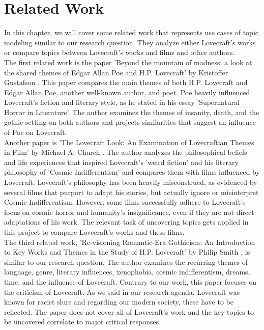 \section{Related Work}

In this chapter, we will cover some related work that represents use cases of topic modeling 
similar to our research question. They analyze either Lovecraft's works or compare topics 
between Lovecraft's works and films and other authors.\\

The first related work is the paper 'Beyond the mountain of madness: a look at the shared 
themes of Edgar Allan Poe and H.P. Lovecraft' by Kristoffer Gustafson \cite{gusta}. This paper compares 
the main themes of both H.P. Lovecraft and Edgar Allan Poe, another well-known author, and 
poet. Poe heavily influenced Lovecraft's fiction and literary style, as he stated in his essay 
'Supernatural Horror in Literature'. The author examines the themes of insanity, death, and the 
gothic setting on both authors and projects similarities that suggest an influence of Poe on 
Lovecraft.\\

Another paper is 'The Lovecraft Look: An Examination of Lovecraftian Themes in Film' by 
Michael A. Church \cite{church}. The author analyzes the philosophical beliefs and life experiences that 
inspired Lovecraft's 'weird fiction' and his literary philosophy of 'Cosmic Indifferentism' 
and compares them with films influenced by Lovecraft. Lovecraft's philosophy has been heavily 
misconstrued, as evidenced by several films that purport to adapt his stories, but actually 
ignore or misinterpret Cosmic Indifferentism. However, some films successfully adhere to 
Lovecraft's focus on cosmic horror and humanity's insignificance, even if they are not direct 
adaptations of his work. The relevant task of uncovering topics gets applied in this project 
to compare Lovecraft's works and these films.\\

The third related work, 'Re-visioning Romantic-Era Gothicism: An Introduction to Key Works 
and Themes in the Study of H.P. Lovecraft' by Philip Smith \cite{smith}, is similar to our research 
question. The author examines the recurring themes of language, genre, literary influences, 
xenophobia, cosmic indifferentism, dreams, time, and the influence of Lovecraft. Contrary 
to our work, this paper focuses on the criticism of Lovecraft. As we said in our research 
agenda, Lovecraft was known for racist slurs and regarding our modern society, these have 
to be reflected. The paper does not cover all of Lovecraft's work and the key topics to be 
uncovered correlate to major critical responses.